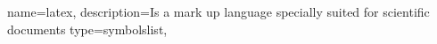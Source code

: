 
\usepackage[
nonumberlist, %
acronym, %
toc, %
section, %
]{glossaries} %
\makeglossary

{
	name=latex,
	description={Is a mark up language specially suited for scientific documents}
	type=symbolslist,	
}
